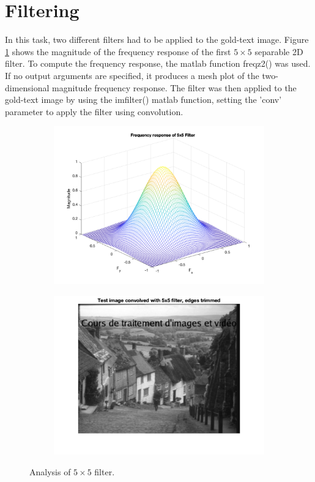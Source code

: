 \documentclass{article}
\begin{document}
\section{Filtering}
In this task, two different filters had to be applied to the gold-text image. Figure \ref{fig:5x5} shows the magnitude of the frequency response of the first $5 \times 5$ separable 2D filter. To compute the frequency response, the matlab function freqz2() was used. If no output arguments are specified, it produces a mesh plot of the two-dimensional magnitude frequency response. The filter was then applied to the gold-text image by using the imfilter() matlab function, setting the 'conv' parameter to apply the filter using convolution. 
\begin{figure}
    \centering
    \begin{subfigure}[c]{0.49\textwidth}
        \includegraphics[width=\textwidth]{images/freq_resp_5x5.png}
    \end{subfigure}
    \hfill
    \begin{subfigure}[c]{0.49\textwidth}
        \includegraphics[width=\textwidth]{images/gold_text_filtered.png}
    \end{subfigure}
    \caption{Analysis of  $5 \times 5$ filter.}
    \label{fig:5x5}
\end{figure}
\end{document}
